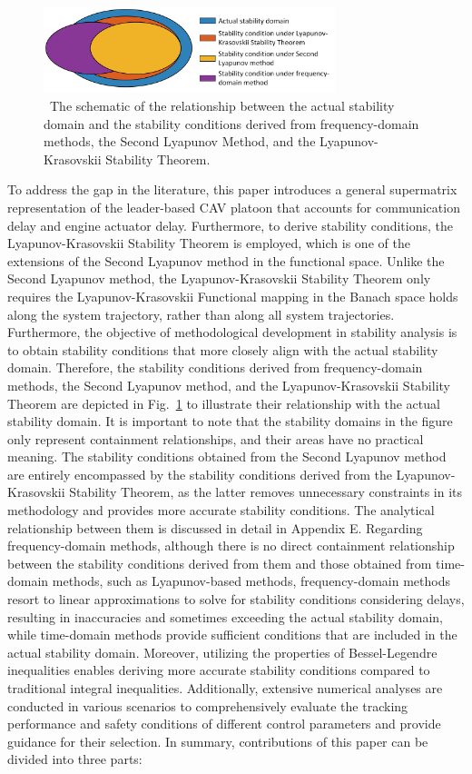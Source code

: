 \documentclass[a4paper]{cas-sc}
\begin{document}
\begin{figure}
  \centering

  \includegraphics[width=8.5cm]{figs/figXX.png}
  \caption{~The schematic of the relationship between the actual stability domain and the stability conditions derived from frequency-domain methods, the Second Lyapunov Method, and the Lyapunov-Krasovskii Stability Theorem.}
  \label{figdiff}
\end{figure}

To address the gap in the literature, this paper introduces a general supermatrix representation of the leader-based CAV platoon that accounts for communication delay and engine actuator delay. Furthermore, to derive stability conditions, the Lyapunov-Krasovskii Stability Theorem is employed, which is one of the extensions of the Second Lyapunov method in the functional space. Unlike the Second Lyapunov method, the Lyapunov-Krasovskii Stability Theorem only requires the Lyapunov-Krasovskii Functional mapping in the Banach space holds along the system trajectory, rather than along all system trajectories. Furthermore, the objective of methodological development in stability analysis is to obtain stability conditions that more closely align with the actual stability domain. Therefore, the stability conditions derived from frequency-domain methods, the Second Lyapunov method, and the Lyapunov-Krasovskii Stability Theorem are depicted in Fig.~\ref{figdiff} to illustrate their relationship with the actual stability domain. It is important to note that the stability domains in the figure only represent containment relationships, and their areas have no practical meaning. The stability conditions obtained from the Second Lyapunov method are entirely encompassed by the stability conditions derived from the Lyapunov-Krasovskii Stability Theorem, as the latter removes unnecessary constraints in its methodology and provides more accurate stability conditions. The analytical relationship between them is discussed in detail in Appendix E. Regarding frequency-domain methods, although there is no direct containment relationship between the stability conditions derived from them and those obtained from time-domain methods, such as Lyapunov-based methods, frequency-domain methods resort to linear approximations to solve for stability conditions considering delays, resulting in inaccuracies and sometimes exceeding the actual stability domain, while time-domain methods provide sufficient conditions that are included in the actual stability domain. Moreover, utilizing the properties of Bessel-Legendre inequalities enables deriving more accurate stability conditions compared to traditional integral inequalities. Additionally, extensive numerical analyses are conducted in various scenarios to comprehensively evaluate the tracking performance and safety conditions of different control parameters and provide guidance for their selection. In summary, contributions of this paper can be divided into three parts:
\end{document}
